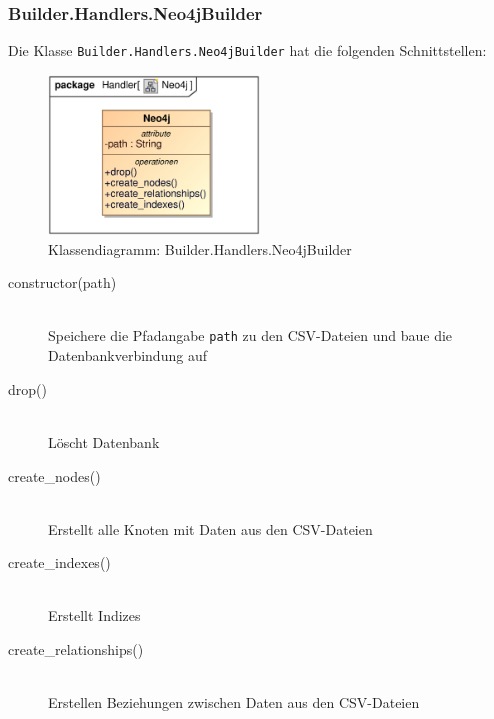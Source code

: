 \subsubsection{Builder.Handlers.Neo4jBuilder}
Die Klasse \verb|Builder.Handlers.Neo4jBuilder| hat die folgenden Schnittstellen:
\begin{figure}[H]
    \myfloatalign
    \includegraphics[width=0.5\textwidth]{gfx/MtGDeepAnalysis/Neo4j.eps}
    \caption{Klassendiagramm: Builder.Handlers.Neo4jBuilder}
    \label{fig:class:builder.handlers.neo4jbuilder}
\end{figure}
\begin{description}
    \item[constructor(path)] \hfill \\
    Speichere die Pfadangabe \verb|path| zu den \ac{CSV}-Dateien und baue die Datenbankverbindung auf
    
    \item[drop()] \hfill \\
    Löscht Datenbank
    
    \item[create\_nodes()] \hfill \\
    Erstellt alle Knoten mit Daten aus den \ac{CSV}-Dateien
    
    \item[create\_indexes()] \hfill \\
    Erstellt Indizes
    
    \item[create\_relationships()] \hfill \\
    Erstellen Beziehungen zwischen Daten aus den \ac{CSV}-Dateien
\end{description}

